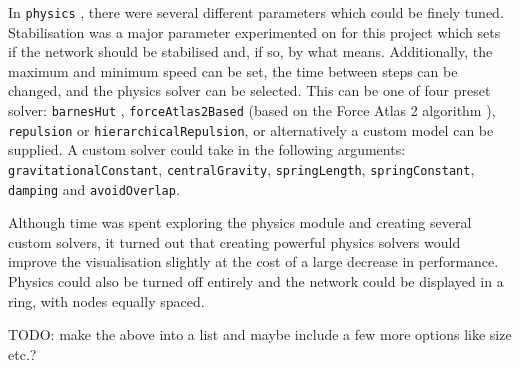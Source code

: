 \documentclass[../dissertation.tex]{subfiles}
\begin{document}
In \texttt{physics} \cite{visjsphysics}, there were several different parameters which could be finely tuned. Stabilisation was a major parameter experimented on for this project which sets if the network should be stabilised and, if so, by what means. Additionally, the maximum and minimum speed can be set, the time between steps can be changed, and the physics solver can be selected. This can be one of four preset solver: \texttt{barnesHut} \cite{barnes1986hierarchical}, \texttt{forceAtlas2Based} (based on the Force Atlas 2 algorithm \cite{jacomy2014forceatlas2}), \texttt{repulsion} or \texttt{hierarchicalRepulsion}, or alternatively a custom model can be supplied. A custom solver could take in the following arguments: \texttt{gravitationalConstant}, \texttt{centralGravity}, \texttt{springLength}, \texttt{springConstant}, \texttt{damping} and \texttt{avoidOverlap}. 

Although time was spent exploring the physics module and creating several custom solvers, it turned out that creating powerful physics solvers would improve the visualisation slightly at the cost of a large decrease in performance. Physics could also be turned off entirely and the network could be displayed in a ring, with nodes equally spaced. 

TODO: make the above into a list and maybe include a few more options like size etc.?
\end{document}
